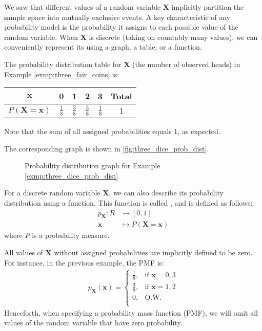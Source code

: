 We saw that different values of a random variable \( \bm{X} \) implicitly partition the sample space into mutually exclusive events.
A key characteristic of any probability model is the probability it assigns to each possible value of the random variable.
When \( \bm{X} \) is discrete (taking on countably many values), we can conveniently represent its  using a graph, a table, or a function.
\begin{exmp}\label{exmp:three_dice_prob_dist}
    The probability distribution table for \( \bm{X} \) (the number of observed heads) in Example \autoref{exmp:three_fair_coins} is:
	\begin{center}
	\begin{tabular}{|c|c|c|c|c|c|}
	\hline
	\( \bm{x} \) & 0 & 1 & 2 & 3 & Total \\
	\hline
	\( P(\bm{X} = \bm{x}) \) & \( \frac{1}{8} \) & \( \frac{3}{8} \) & \( \frac{3}{8} \) & \( \frac{1}{8} \) & \( 1 \) \\
	\hline
	\end{tabular}
	\end{center}
    Note that the sum of all assigned probabilities equals 1, as expected.

    The corresponding graph is shown in \autoref{fig:three_dice_prob_dist}.
    \begin{figure}[t]
    \begin{center}
    \end{center}
    \caption{Probability distribution graph for Example \autoref{exmp:three_dice_prob_dist}}
    \label{fig:three_dice_prob_dist}
    \end{figure}
\end{exmp}
For a discrete random variable \( \bm{X} \), we can also describe its probability distribution using a function.
This function is called , and is defined as follows:
\begin{align*}
    p_{\bm{X}} \colon R &\to [0, 1] \\
    \bm{x} &\mapsto P(\bm{X} = \bm{x})
\end{align*}
where \( P \) is a probability measure.

All values of \( \bm{X} \) without assigned probabilities are implicitly defined to be zero.
For instance, in the previous example, the PMF is:
\begin{gather*}
    p_{\bm{X}}(\bm{x}) = \begin{cases}
        \frac{1}{8}, & \text{if } \bm{x} = 0, 3\\
        \frac{3}{8}, & \text{if } \bm{x} = 1, 2\\
        0, & \text{O.W.}\\
    \end{cases}
\end{gather*}
Henceforth, when specifying a probability mass function (PMF), we will omit all values of the random variable that have zero probability.

